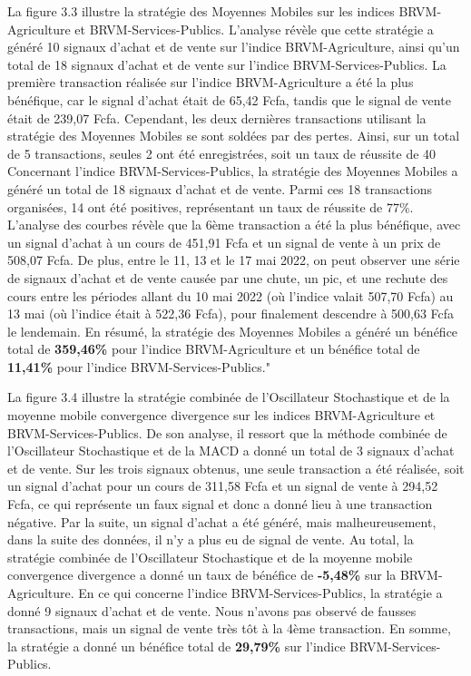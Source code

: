 \begin{itemize}
La figure 3.3 illustre la stratégie des Moyennes Mobiles sur les indices 
BRVM-Agriculture et BRVM-Services-Publics. L'analyse révèle que cette stratégie 
a généré 10 signaux d'achat et de vente sur l'indice BRVM-Agriculture, ainsi
qu'un total de 18 signaux d'achat et de vente sur l'indice BRVM-Services-Publics.
La première transaction réalisée sur l'indice BRVM-Agriculture a été la plus
 bénéfique, car le signal d'achat était de 65,42 Fcfa, tandis que le signal 
 de vente était de 239,07 Fcfa. Cependant, les deux dernières transactions 
 utilisant la stratégie des Moyennes Mobiles se sont soldées par des pertes.
  Ainsi, sur un total de 5 transactions, seules 2 ont été enregistrées, soit 
  un taux de réussite de 40%
Concernant l'indice BRVM-Services-Publics, la stratégie des Moyennes Mobiles a
 généré un total de 18 signaux d'achat et de vente. Parmi ces 18 transactions 
 organisées, 14 ont été positives, représentant un taux de réussite de 77\%. 
 L'analyse des courbes révèle que la 6ème transaction a été la plus bénéfique, 
 avec un signal d'achat à un cours de 451,91 Fcfa et un signal de vente à un prix 
 de 508,07 Fcfa. De plus, entre le 11, 13 et le 17 mai 2022, on peut observer une 
 série de signaux d'achat et de vente causée par une chute, un pic, et une rechute 
 des cours entre les périodes allant du 10 mai 2022 (où l'indice valait 507,70 Fcfa)
  au 13 mai (où l'indice était à 522,36 Fcfa), pour finalement descendre à 
  500,63 Fcfa le lendemain.
En résumé, la stratégie des Moyennes Mobiles a généré un bénéfice total de 
\textbf{359,46\%} pour l'indice BRVM-Agriculture et un bénéfice total de 
\textbf{11,41\%} pour l'indice BRVM-Services-Publics."



La figure 3.4 illustre la stratégie combinée de l'Oscillateur Stochastique et de 
la moyenne mobile convergence divergence sur les indices BRVM-Agriculture et 
BRVM-Services-Publics. De son analyse, il ressort que la méthode combinée de 
l'Oscillateur Stochastique et de la MACD a donné un total de 3 signaux d'achat 
et de vente. 
Sur les trois signaux obtenus, une seule transaction a été réalisée, soit un signal
d'achat pour un cours de 311,58 Fcfa et un signal de vente à 294,52 Fcfa, ce qui
représente un faux signal et donc a donné lieu à une transaction négative. Par la
suite, un signal d'achat a été généré, mais malheureusement, dans la suite des 
données, il n'y a plus eu de signal de vente.
Au total, la stratégie combinée de l'Oscillateur Stochastique et de la moyenne 
mobile convergence divergence a donné un taux de bénéfice de \textbf{-5,48\%} sur 
la BRVM-Agriculture.
En ce qui concerne l'indice BRVM-Services-Publics, la stratégie a donné 9 signaux 
d'achat et de vente. Nous n'avons pas observé de fausses transactions, mais un signal
de vente très tôt à la 4ème transaction.
En somme, la stratégie a donné un bénéfice total de \textbf{29,79\%} sur l'indice 
BRVM-Services-Publics.



\end{itemize}

